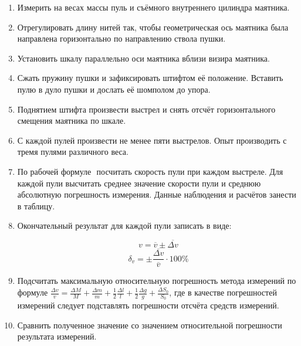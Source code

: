 \begin{enumerate}
    \item Измерить на весах массы пуль и съёмного внутреннего цилиндра маятника.

    \item Отрегулировать длину нитей так, чтобы геометрическая ось маятника была направлена горизонтально по направлению ствола пушки.

    \item Установить шкалу параллельно оси маятника вблизи визира маятника.
    
    \item Сжать пружину пушки и зафиксировать штифтом её положение. Вставить пулю в дуло пушки и дослать её шомполом до упора.
    
    \item Поднятием штифта произвести выстрел и снять отсчёт горизонтального смещения маятника по шкале.
    
    \item С каждой пулей произвести не менее пяти выстрелов. Опыт производить с тремя пулями различного веса.
    
    \item По рабочей формуле $  $ посчитать скорость пули при каждом выстреле. %
    Для каждой пули высчитать среднее значение скорости пули и среднюю абсолютную погрешность измерения.
    Данные наблюдения и расчётов занести в таблицу.
    
    \item Окончательный результат для каждой пули записать в виде:
    
    \begin{equation} 
            v = \overline{v} \pm \overline{\Delta v}
    \end{equation}
    \begin{equation} 
            \delta_v=\pm\frac{\overline{\Delta v}}{\overline{v}}\cdot 100 \%
    \end{equation}

    \item Подсчитать максимальную относительную погрешность метода измерений по формуле
    $\frac{\Delta v}{v}=\frac{\Delta M}{M}+\frac{\Delta m}{m}+\frac{1}{2}\frac{\Delta l}{l}+\frac{1}{2}\frac{\Delta g}{g}+\frac{\Delta S_0}{S_0}$,
    где в качестве погрешностей измерений следует подставлять погрешности отсчёта средств измерений.

    \item Сравнить полученное значение со значением относительной погрешности результата измерений.
\end{enumerate}